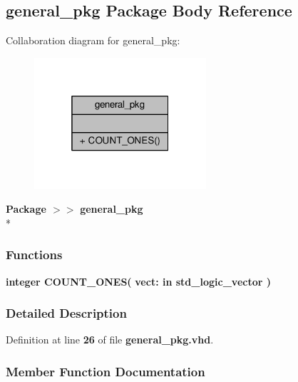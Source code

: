 \subsection{general\+\_\+pkg Package Body Reference}
\label{class__general__pkg}


Collaboration diagram for general\+\_\+pkg\+:\nopagebreak
\begin{figure}[H]
\begin{center}
\leavevmode
\includegraphics[width=181pt]{d0/d7a/class__general__pkg__coll__graph}
\end{center}
\end{figure}
{\bfseries Package $>$$>$ }{\bf general\+\_\+pkg}\\*
\subsubsection*{Functions}
 \begin{DoxyCompactItemize}
\item 
{\bfseries {\bfseries \textcolor{comment}{integer}\textcolor{vhdlchar}{ }}} {\bf C\+O\+U\+N\+T\+\_\+\+O\+N\+ES}{\bfseries  ( }{\bfseries \textcolor{vhdlchar}{vect\+: }\textcolor{stringliteral}{in }{\bfseries \textcolor{comment}{std\+\_\+logic\+\_\+vector}\textcolor{vhdlchar}{ }}}{\bfseries  )} 
\end{DoxyCompactItemize}


\subsubsection{Detailed Description}


Definition at line {\bf 26} of file {\bf general\+\_\+pkg.\+vhd}.



\subsubsection{Member Function Documentation}
